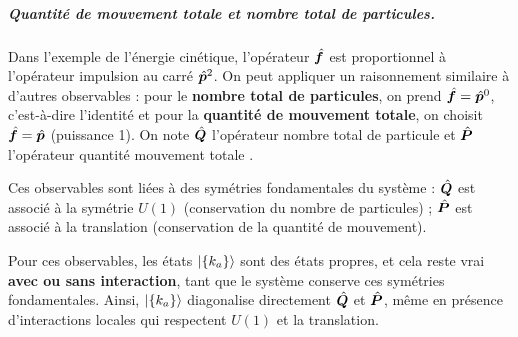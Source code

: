 
\subparagraph{Quantité de mouvement totale et nombre total de particules.}
Dans l'exemple de l'énergie cinétique, l'opérateur  $\hat{\bm{f}}$ est proportionnel à l'opérateur impulsion au carré $\hat{\bm{p}}^2$. On peut appliquer un raisonnement similaire à d'autres observables : pour le {\bf nombre total de particules}, on prend  $\hat{\bm{f}} = \hat{\bm{p}}^0$, c’est-à-dire l’identité et pour la {\bf quantité de mouvement totale}, on choisit $\hat{\bm{f}} = \hat{\bm{p}}$ (puissance 1). On note $\hat{\bm{Q}}$ l'opérateur nombre total de particule et $\hat{\bm{P}}$ l'opérateur quantité mouvement totale . 

\medskip

Ces observables sont liées à des symétries fondamentales du système : $\hat{\bm{Q}}$ est associé à la symétrie $U(1)$ (conservation du nombre de particules) ; $\hat{\bm{P}}$ est associé à la translation (conservation de la quantité de mouvement).

Pour ces observables, les états $\ket{\{k_a\}}$ sont des états propres, et cela reste vrai \textbf{avec ou sans interaction}, tant que le système conserve ces symétries fondamentales. Ainsi, $\ket{\{k_a\}}$ diagonalise directement $\hat{\bm{Q}}$ et $\hat{\bm{P}}$, même en présence d’interactions locales qui respectent $U(1)$ et la translation.

\medskip


